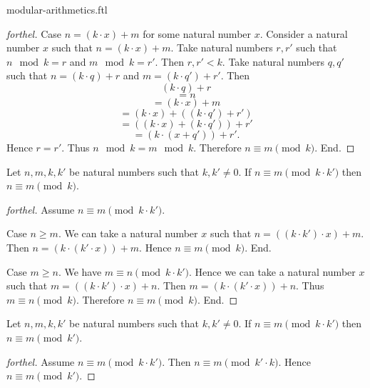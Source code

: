 \documentclass{naproche-library}
\begin{document}
\begin{smodule}{modular-arithmetics.ftl}
\begin{proof}[forthel]
    Case $n = (k \cdot x) + m$ for some natural number $x$.
      Consider a natural number $x$ such that $n = (k \cdot x) + m$.
      Take natural numbers $r, r'$ such that $n \mod k = r$ and $m \mod k = r'$.
      Then $r, r' < k$.
      Take natural numbers $q, q'$ such that $n = (k \cdot q) + r$ and $m = (k \cdot q') + r'$.
      Then
      \[  (k \cdot q) + r                         \]
      \[    = n                                   \]
      \[    = (k \cdot x) + m                     \]
      \[    = (k \cdot x) + ((k \cdot q') + r')   \]
      \[    = ((k \cdot x) + (k \cdot q')) + r'   \]
      \[    = (k \cdot (x + q')) + r'.            \]
      Hence $r = r'$.
      Thus $n \mod k = m \mod k$.
      Therefore $n \equiv m \pmod{k}$.
    End.
  \end{proof}

  \begin{proposition}[forthel,id=ARITHMETIC_08_2988318228742144]
    Let $n, m, k, k'$ be natural numbers such that $k, k' \neq 0$.
    If $n \equiv m \pmod{k \cdot k'}$ then $n \equiv m \pmod{k}$.
  \end{proposition}
  \begin{proof}[forthel]
    Assume $n \equiv m \pmod{k \cdot k'}$.

    Case $n \geq m$.
      We can take a natural number $x$ such that $n = ((k \cdot k') \cdot x) + m$.
      Then $n = (k \cdot (k' \cdot x)) + m$.
      Hence $n \equiv m \pmod{k}$.
    End.

    Case $m \geq n$.
      We have $m \equiv n \pmod{k \cdot k'}$.
      Hence we can take a natural number $x$ such that $m = ((k \cdot k') \cdot x) + n$.
      Then $m = (k \cdot (k' \cdot x)) + n$.
      Thus $m \equiv n \pmod{k}$.
      Therefore $n \equiv m \pmod{k}$.
    End.
  \end{proof}

  \begin{corollary}[forthel,id=ARITHMETIC_08_5895145169879040]
    Let $n, m, k, k'$ be natural numbers such that $k, k' \neq 0$.
    If $n \equiv m \pmod{k \cdot k'}$ then $n \equiv m \pmod{k'}$.
  \end{corollary}
  \begin{proof}[forthel]
    Assume $n \equiv m \pmod{k \cdot k'}$.
    Then $n \equiv m \pmod{k' \cdot k}$.
    Hence $n \equiv m \pmod{k'}$.
  \end{proof}


\end{smodule}
\end{document}
